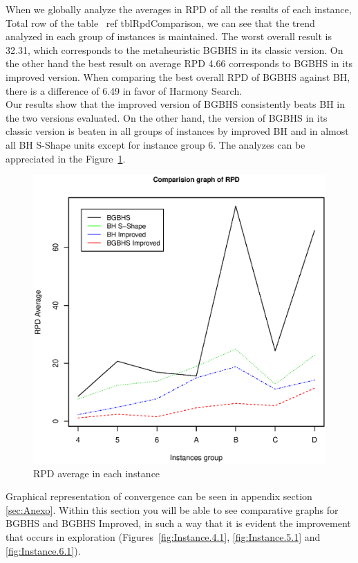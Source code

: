 When we globally analyze the averages in RPD of all the results of each instance, Total row of the table \ ref {tblRpdComparison}, we can see that the trend analyzed in each group of instances is maintained.
The worst overall result is 32.31, which corresponds to the metaheuristic BGBHS in its classic version. On the other hand the best result on average RPD 4.66 corresponds to BGBHS in its improved version. When comparing the best overall RPD of BGBHS against BH, there is a difference of 6.49 in favor of Harmony Search.\\

Our results show that the improved version of BGBHS consistently beats BH in the two versions evaluated. On the other hand, the version of BGBHS in its classic version is beaten in all groups of instances by improved BH and in almost all BH S-Shape units except for instance group 6. The analyzes can be appreciated in the Figure~\ref{fig:RPDAverage}.\\

\begin{figure}[H]
\centering
\includegraphics[scale=.55]{Analisys/comparisionGraph.eps}
\caption{RPD average in each instance}
\label{fig:RPDAverage}
\end{figure}

Graphical representation of convergence can be seen in appendix section \ref{sec:Anexo}. Within this section you will be able to see comparative graphs for BGBHS and BGBHS Improved, in such a way that it is evident the improvement that occurs in exploration (Figures~\ref{fig:Instance.4.1}, \ref{fig:Instance.5.1} and \ref{fig:Instance.6.1}).

